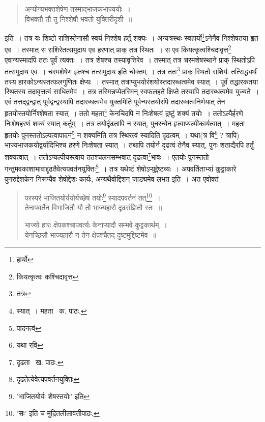 \documentclass[11pt, openany]{book}
\begin{document}
\begin{quote}
{\qt अन्योन्यभक्तशेषेण तस्माद्भाजकभाज्ययोः~।\\
विभक्तौ तौ तु निश्शेषौ भवतो युक्तिरीदृशी~॥}
\end{quote}

\noindent इति~। तत्र यः शिष्टो राशिस्तेनासौ स्वयं निश्शेष हर्तुं शक्यः~। अन्यत्रस्थः स्वहार्यो\renewcommand{\thefootnote}{१}\footnote{हार्यो}ऽनेनैव निश्शेषतया हृत एव~। तस्मात् स राशिरेतत्समुदाय एव हरणात् प्राक् तत्र स्थितः~। स एव कियत्कृत्वश्चिदावृत्त\renewcommand{\thefootnote}{२}\footnote{कियत्कृत्वः कश्चिदावृत्त} एवान्यस्मादपि ततः पूर्वं त्यक्तः~। तत्र शेषश्च तस्यावृत्तिरेव~। तस्मात् तत्र चरमशेषस्थाने प्राक् स्थितोऽपि तत्समुदाय एव~। चरमशेषेण हृतश्च तत्समुदाय इति चोक्तम्~। तत्र ततः\renewcommand{\thefootnote}{३}\footnote{तत्र} प्राक् स्थितो राशिर्यः तत्सिद्ध्यर्थं तस्य हारकोऽन्यस्तत्फलगुणितः क्षेप्यः~। तस्मात् तत्राप्युभयोरंशयोस्तदारब्धत्वमेव स्यात्~। पूर्वं तद्धारकतया स्थितस्य तदावृत्तत्वं साधितमेव~। तत्र तस्मिन्नप्येतस्मिन् स्वफलहते क्षिप्ते तस्यापि तदारब्धत्वमेव युज्यते~। एवं तत्तद्द्वन्द्वात् पूर्वद्वन्द्वस्यापि तदारब्धत्वमेव युक्तमिति पूर्वन्यस्तयोरपि तदारब्धत्वनिर्णयात् तेन हृतयोस्तयोर्निश्शेषता स्यात्~। ततो महता\renewcommand{\thefootnote}{४}\footnote{स्यात्~। महता \textendash\ क. पाठः.} केनचिदपि न निःशेषत्वं द्रष्टुं शक्यं तयोः~। ततोऽल्पैर्हरणे निःशेषहरणं शक्यं स्यात् कर्तुम्~। तत्र तयोर्दृढतापि न स्यात्, पुनरन्येन हृत्वाप्यल्पीकार्यत्वात्~। महता हृतयोः पुनस्ततोऽल्पत्वापादनं\renewcommand{\thefootnote}{५}\footnote{पादनत्वं} न शक्यमिति तत्र स्थिरत्वं स्यादिति दृढत्वम्~। यथा(त्र वि\renewcommand{\thefootnote}{६}\footnote{यथा रवि} ? त्रापि) भाज्यभाजकयोर्द्व्यादिभिश्च हरणे निःशेषता स्यात्~। तथापि तयोर्न दृढत्वं तेनैव स्यात्, पुनः शताद्यैरपि हर्तुं शक्यत्वात्~। ततोऽप्यल्पीयस्त्वाय ततश्चलनसम्भवात् दृढत्वा\renewcommand{\thefootnote}{७}\footnote{दृढता \textendash\ ख. पाठः.}भावः~। एतयोः पुनस्ततो गन्तुमवकाशाभावाद्दृढतैवेत्यपवर्तनयुक्तिः\renewcommand{\thefootnote}{८}\footnote{दृढतेत्येवेत्यपवर्तनयुक्तिः}~। तत्र यथेष्टं शेषोऽप्युद्देष्टव्यः~। अपवर्तिताभ्यां कुट्टाकारे पुनरुद्देशकेन निरूप्यैव शेषोद्देशः कार्यः, अन्यथैवोद्दिशन् जाड्यमेव लभत इति~। अत एवोक्तं\textendash

\begin{quote}
{\qt परस्परं भाजितयोर्ययोर्यच्छेषं तयोः\renewcommand{\thefootnote}{*}\footnote{'भाजितयोर्यः शेषस्तयोः' इति} स्यादपवर्तनं तत्\renewcommand{\thefootnote}{$\dagger$}\footnote{'सः' इति च मुद्रितलीलावतीपाठः.}~।\\
तेनापवर्तेन विभाजितौ यौ तौ भाज्यहारौ दृढसंज्ञितौ स्तः~॥
		
भाज्यो हारः क्षेपकश्चापवर्त्यः केनाप्यादौ सम्भवे कुट्टकार्थम्~।\\
येनच्छिन्नौ भाज्यहारौ न तेन क्षेपश्चैतद् दुष्टमुद्दिष्टमेव~॥}
\end{quote}
\end{document}
